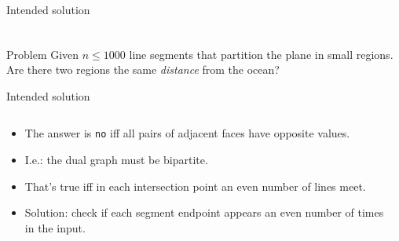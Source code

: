 \begin{frame}
\begin{block}{Intended solution}
\begin{columns}
\begin{column}{0.42\textwidth}
\begin{center}
      \end{center}
      \end{column}
      \end{columns}
    \end{block}
\end{frame}
\begin{frame}
    \frametitle{\problemtitle}
    \begin{block}{Problem}
      Given $n\leq 1000$ line segments that partition the plane in small
      regions.
      Are there two regions the same \emph{distance} from the ocean?
    \end{block}
    \begin{block}{Intended solution}
      \begin{columns}
      \begin{column}{0.5\textwidth}
      \begin{itemize}
        \item<+-> The answer is \texttt{no} iff all pairs of adjacent faces have
          opposite values.
        \item<+-> I.e.: the dual graph must be bipartite.
        \item<+-> That's true iff in each intersection point an even number of
          lines meet.
        \item<+-> Solution: check if each segment endpoint appears an even number of
          times in the input.
      \end{itemize}
      \end{column}
      \begin{column}{0.42\textwidth}
      \begin{center}

\end{center}
\end{column}
\end{columns}
\end{block}
\end{frame}
